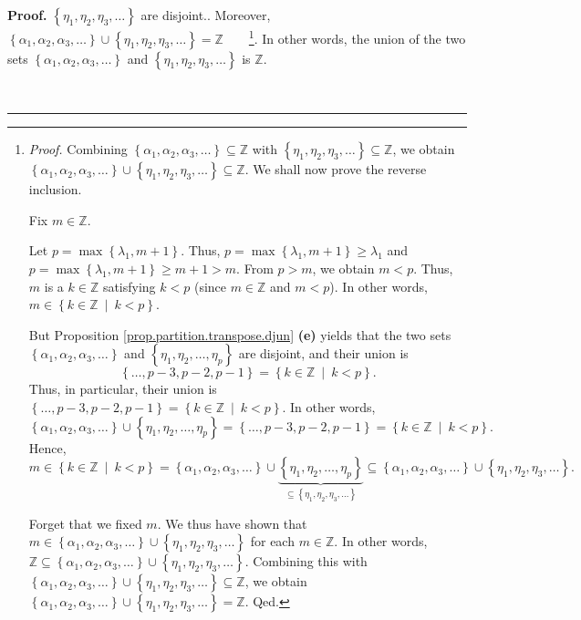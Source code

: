 \documentclass[numbers=enddot,12pt,final,onecolumn,notitlepage]{scrartcl}%
\theoremstyle{definition}
\newenvironment{proof}[1][Proof]{\noindent\textbf{#1.} }{\ \rule{0.5em}{0.5em}}
\newenvironment{verlong}{}{}
\begin{document}
\begin{verlong}
\begin{proof}
{$\left\{  \eta_{1},\eta_{2},\eta_{3},\ldots\right\}  $ are disjoint.}.
Moreover, $\left\{  \alpha_{1},\alpha_{2},\alpha_{3},\ldots\right\}
\cup\left\{  \eta_{1},\eta_{2},\eta_{3},\ldots\right\}  =\mathbb{Z}%
$\ \ \ \ \footnote{\textit{Proof.} Combining $\left\{  \alpha_{1},\alpha
_{2},\alpha_{3},\ldots\right\}  \subseteq\mathbb{Z}$ with $\left\{  \eta
_{1},\eta_{2},\eta_{3},\ldots\right\}  \subseteq\mathbb{Z}$, we obtain
$\left\{  \alpha_{1},\alpha_{2},\alpha_{3},\ldots\right\}  \cup\left\{
\eta_{1},\eta_{2},\eta_{3},\ldots\right\}  \subseteq\mathbb{Z}$. We shall now
prove the reverse inclusion.
\par
Fix $m\in\mathbb{Z}$.
\par
Let $p=\max\left\{  \lambda_{1},m+1\right\}  $. Thus, $p=\max\left\{
\lambda_{1},m+1\right\}  \geq\lambda_{1}$ and $p=\max\left\{  \lambda
_{1},m+1\right\}  \geq m+1>m$. From $p>m$, we obtain $m<p$. Thus, $m$ is a
$k\in\mathbb{Z}$ satisfying $k<p$ (since $m\in\mathbb{Z}$ and $m<p$). In other
words, $m\in\left\{  k\in\mathbb{Z}\ \mid\ k<p\right\}  $.
\par
But Proposition \ref{prop.partition.transpose.djun} \textbf{(e)} yields that
the two sets $\left\{  \alpha_{1},\alpha_{2},\alpha_{3},\ldots\right\}  $ and
$\left\{  \eta_{1},\eta_{2},\ldots,\eta_{p}\right\}  $ are disjoint, and their
union is
\[
\left\{  \ldots,p-3,p-2,p-1\right\}  =\left\{  k\in\mathbb{Z}\ \mid
\ k<p\right\}  .
\]
Thus, in particular, their union is $\left\{  \ldots,p-3,p-2,p-1\right\}
=\left\{  k\in\mathbb{Z}\ \mid\ k<p\right\}  $. In other words,%
\[
\left\{  \alpha_{1},\alpha_{2},\alpha_{3},\ldots\right\}  \cup\left\{
\eta_{1},\eta_{2},\ldots,\eta_{p}\right\}  =\left\{  \ldots
,p-3,p-2,p-1\right\}  =\left\{  k\in\mathbb{Z}\ \mid\ k<p\right\}  .
\]
Hence,%
\[
m\in\left\{  k\in\mathbb{Z}\ \mid\ k<p\right\}  =\left\{  \alpha_{1}%
,\alpha_{2},\alpha_{3},\ldots\right\}  \cup\underbrace{\left\{  \eta_{1}%
,\eta_{2},\ldots,\eta_{p}\right\}  }_{\subseteq\left\{  \eta_{1},\eta_{2}%
,\eta_{3},\ldots\right\}  }\subseteq\left\{  \alpha_{1},\alpha_{2},\alpha
_{3},\ldots\right\}  \cup\left\{  \eta_{1},\eta_{2},\eta_{3},\ldots\right\}
.
\]
\par
Forget that we fixed $m$. We thus have shown that $m\in\left\{  \alpha
_{1},\alpha_{2},\alpha_{3},\ldots\right\}  \cup\left\{  \eta_{1},\eta_{2}%
,\eta_{3},\ldots\right\}  $ for each $m\in\mathbb{Z}$. In other words,
$\mathbb{Z}\subseteq\left\{  \alpha_{1},\alpha_{2},\alpha_{3},\ldots\right\}
\cup\left\{  \eta_{1},\eta_{2},\eta_{3},\ldots\right\}  $. Combining this with
$\left\{  \alpha_{1},\alpha_{2},\alpha_{3},\ldots\right\}  \cup\left\{
\eta_{1},\eta_{2},\eta_{3},\ldots\right\}  \subseteq\mathbb{Z}$, we obtain
$\left\{  \alpha_{1},\alpha_{2},\alpha_{3},\ldots\right\}  \cup\left\{
\eta_{1},\eta_{2},\eta_{3},\ldots\right\}  =\mathbb{Z}$. Qed.}. In other
words, the union of the two sets $\left\{  \alpha_{1},\alpha_{2},\alpha
_{3},\ldots\right\}  $ and $\left\{  \eta_{1},\eta_{2},\eta_{3},\ldots
\right\}  $ is $\mathbb{Z}$.


\end{proof}
\end{verlong}
\end{document}
